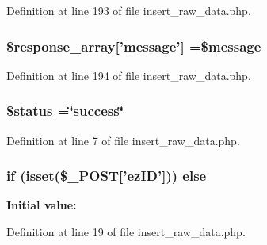 Definition at line 193 of file insert\-\_\-raw\-\_\-data.\-php.

\hypertarget{insert__raw__data_8php_afbd905fa933d965e67e5d4d1ff860553}{
\subsubsection[{\$response\-\_\-array}]{\setlength{\rightskip}{0pt plus 5cm}\$response\-\_\-array\mbox{[}'message'\mbox{]} =\$message}}\label{insert__raw__data_8php_afbd905fa933d965e67e5d4d1ff860553}


Definition at line 194 of file insert\-\_\-raw\-\_\-data.\-php.

\hypertarget{insert__raw__data_8php_a58391ea75f2d29d5d708d7050b641c33}{
\subsubsection[{\$status}]{\setlength{\rightskip}{0pt plus 5cm}\$status =\char`\"{}success\char`\"{}}}\label{insert__raw__data_8php_a58391ea75f2d29d5d708d7050b641c33}


Definition at line 7 of file insert\-\_\-raw\-\_\-data.\-php.

\hypertarget{insert__raw__data_8php_aa869f48d9730e52be32b3ada5833d2ac}{
\subsubsection[{else}]{\setlength{\rightskip}{0pt plus 5cm}if (isset(\$\-\_\-\-P\-O\-S\-T\mbox{[}'{\bf ez\-I\-D}'\mbox{]})) else}}\label{insert__raw__data_8php_aa869f48d9730e52be32b3ada5833d2ac}
{\bfseries Initial value\-:}


Definition at line 19 of file insert\-\_\-raw\-\_\-data.\-php.

